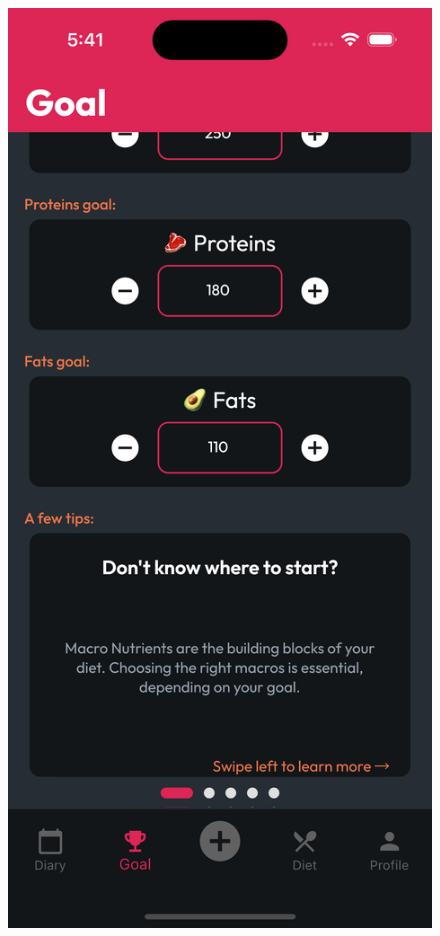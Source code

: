 \documentclass{Configuration_Files/PoliMi3i_thesis}
\begin{document}
\begin{figure}[!h]
  \centering
  \includegraphics[scale=0.1]{Images/Screenshots/Mobile/Goal2.png}

\end{figure}
\end{document}
